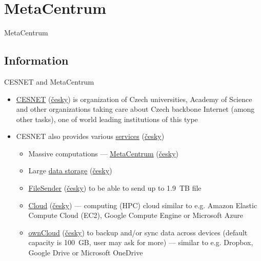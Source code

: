 \documentclass[compress, xelatex, 11pt, xcolor=svgnames, aspectratio=169, url={hyphens, lowtilde}]{beamer}
\begin{document}
\section{MetaCentrum} %

\begin{frame}{MetaCentrum}
	\tableofcontents[currentsection, sectionstyle=show/hide, hideothersubsections]
\end{frame}

\subsection{Information}

\begin{frame}[allowframebreaks]{CESNET and MetaCentrum}
	\label{CESNET}
	\begin{itemize}
		\item \href{https://www.cesnet.cz/en}{CESNET} (\href{https://www.cesnet.cz/}{česky}) is organization of Czech universities, Academy of Science and other organizations taking care about Czech backbone Internet (among other tasks), one of world leading institutions of this type
		\item CESNET also provides various \href{https://www.cesnet.cz/en/services}{services} (\href{https://www.cesnet.cz/sluzby/}{česky})
		\begin{itemize}
			\item Massive computations --- \href{https://www.cesnet.cz/en/services/computing-2/metacentrum-10}{MetaCentrum} (\href{https://www.cesnet.cz/sluzby/vypocty-2/narocne-vypocty-metacentrum-10}{česky})
			\item Large \href{https://www.cesnet.cz/en/services/data-storage-3}{data storage} (\href{https://www.cesnet.cz/sluzby/datova-uloziste-3/datova-uloziste-13}{česky})
			\item \href{https://www.cesnet.cz/en/services/data-storage-3/filesender-15}{FileSender} (\href{https://www.cesnet.cz/sluzby/datova-uloziste-3/filesender-15}{česky}) to be able to send up to 1.9~TB file
			\item \href{https://www.metacentrum.cz/en/Sluzby/Cloud/}{Cloud} (\href{https://www.metacentrum.cz/cs/Sluzby/Cloud/}{česky}) --- computing (HPC) cloud similar to e.g. Amazon Elastic Compute Cloud (EC2), Google Compute Engine or Microsoft Azure
			\item \href{https://www.cesnet.cz/en/services/data-storage-3/owncloud-16}{ownCloud} (\href{https://www.cesnet.cz/sluzby/datova-uloziste-3/owncloud-16}{česky}) to backup and/or sync data across devices (default capacity is 100~GB, user may ask for more) --- similar to e.g. Dropbox, Google Drive or Microsoft OneDrive

\end{itemize}
\end{itemize}
\end{frame}
\end{document}
